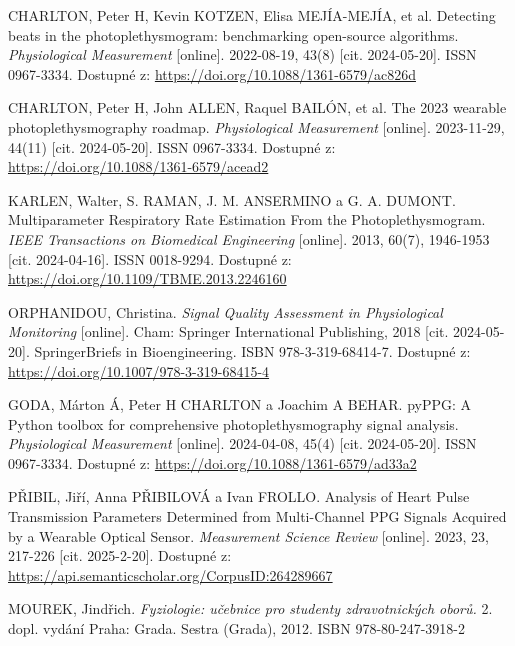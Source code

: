 \begin{thebibliography}{99}
		CHARLTON, Peter H, Kevin KOTZEN, Elisa MEJÍA-MEJÍA, et al.
		Detecting beats in the photoplethysmogram: benchmarking open-source algorithms.
		\emph{Physiological Measurement} [online].
		2022-08-19, 43(8) [cit. 2024-05-20].
		ISSN 0967-3334.
		Dostupné z: \url{https://doi.org/10.1088/1361-6579/ac826d}

		CHARLTON, Peter H, John ALLEN, Raquel BAILÓN, et al.
		The 2023 wearable photoplethysmography roadmap.
		\emph{Physiological Measurement} [online].
		2023-11-29, 44(11) [cit. 2024-05-20].
		ISSN 0967-3334.
		Dostupné z: \url{https://doi.org/10.1088/1361-6579/acead2}

		KARLEN, Walter, S. RAMAN, J. M. ANSERMINO a G. A. DUMONT.
		Multiparameter Respiratory Rate Estimation From the Photoplethysmogram.
		\emph{IEEE Transactions on Biomedical Engineering} [online].
		2013, 60(7), 1946-1953 [cit. 2024-04-16].
		ISSN 0018-9294.
		Dostupné z: \url{https://doi.org/10.1109/TBME.2013.2246160}

		ORPHANIDOU, Christina.
		\emph{Signal Quality Assessment in Physiological Monitoring} [online].
		Cham: Springer International Publishing, 2018 [cit. 2024-05-20].
		SpringerBriefs in Bioengineering.
		ISBN 978-3-319-68414-7.
		Dostupné z: \url{https://doi.org/10.1007/978-3-319-68415-4}

		GODA, Márton Á, Peter H CHARLTON a Joachim A BEHAR.
		pyPPG: A Python toolbox for comprehensive photoplethysmography signal analysis.
		\emph{Physiological Measurement} [online].
		2024-04-08, 45(4) [cit. 2024-05-20].
		ISSN 0967-3334.
		Dostupné z: \url{https://doi.org/10.1088/1361-6579/ad33a2}

		PŘIBIL, Jiří, Anna PŘIBILOVÁ a Ivan FROLLO.
		Analysis of Heart Pulse Transmission Parameters Determined from Multi-Channel PPG Signals Acquired by a Wearable Optical Sensor.
		\emph{Measurement Science Review} [online].
		2023, 23, 217-226 [cit. 2025-2-20].
		Dostupné z: \url{https://api.semanticscholar.org/CorpusID:264289667}

		MOUREK, Jindřich.
		\emph{Fyziologie: učebnice pro studenty zdravotnických oborů.}
		2.\, dopl. vydání Praha: Grada. Sestra (Grada), 2012.
		ISBN 978-80-247-3918-2


\end{thebibliography}
